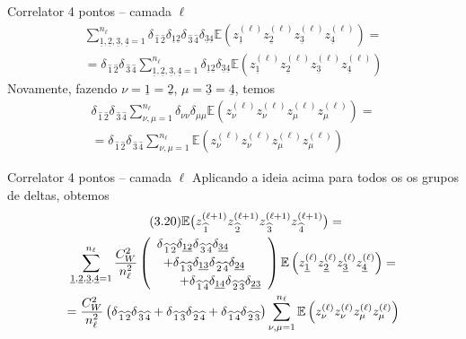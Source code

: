 \documentclass{beamer}
\newcommand{\EE}{\mathbb{E}}
\def\mi#1{{\,\widehat{#1}}}
\def\mj#1{\underline{#1}}
\def\eell{{(\ell)}}
\def\eellum{{(\ell+1)}}
\begin{document}
\begin{frame}{Correlator 4 pontos -- camada $\ell$}
	\begin{multline*}
		\sum_{\mj1,\mj2,\mj3,\mj4=1}^{n_\ell} \delta_{\mi1\mi2}\delta_{\mj1\mj2}\delta_{\mi3\mi4}\delta_{\mj3\mj4} \EE\left( z^\eell_{\mj1}z^\eell_{\mj2}z^\eell_{\mj3}z^\eell_{\mj4}\right) = \\
		= \delta_{\mi1\mi2}\delta_{\mi3\mi4}\sum_{\mj1,\mj2,\mj3,\mj4=1}^{n_\ell} \delta_{\mj1\mj2}\delta_{\mj3\mj4} \EE\left( z^\eell_{\mj1}z^\eell_{\mj2}z^\eell_{\mj3}z^\eell_{\mj4}\right) 
	\end{multline*}
Novamente, fazendo $\nu = \mj1 = \mj2$, $\mu = \mj3 = \mj4$, temos
\begin{multline*}
		\delta_{\mi1\mi2}\delta_{\mi3\mi4}\sum_{\nu,\mu=1}^{n_\ell} \delta_{\nu\nu}\delta_{\mu\mu} \EE\left( z^\eell_{\nu}z^\eell_{\nu}z^\eell_{\mu}z^\eell_{\mu}\right) = \\ 
		=\delta_{\mi1\mi2}\delta_{\mi3\mi4}\sum_{\nu,\mu=1}^{n_\ell} \EE\left( z^\eell_{\nu}z^\eell_{\nu} z^\eell_{\mu}z^\eell_{\mu}\right)
\end{multline*}
\end{frame}

\begin{frame}{Correlator 4 pontos -- camada $\ell$}
	Aplicando a ideia acima para todos os os grupos de deltas, obtemos
	\begin{multline*}\tag{3.20}
		\EE\big(z^\eellum_{\mi1} z^\eellum_{\mi2} z^\eellum_{\mi3} z^\eellum_{\mi4}\big) = \\
		\sum_{\mj1,\mj2,\mj3,\mj4=1}^{n_\ell}\frac{C_W^2}{n_\ell^2}\left(\begin{array}{r}
			\delta_{\mi1\mi2}\delta_{\mj1\mj2}\delta_{\mi3\mi4}\delta_{\mj3\mj4} \hspace{6ex} \\[1mm] 
			+\delta_{\mi1\mi3}\delta_{\mj1\mj3} \delta_{\mi2\mi4}\delta_{\mj2\mj4} \hspace{3ex} \\[1mm]
			+  \delta_{\mi1\mi4}\delta_{\mj1\mj4} \delta_{\mi2\mi3}\delta_{\mj2\mj3}
		\end{array}\right)\EE\left( z^\eell_{\mj1}z^\eell_{\mj2}z^\eell_{\mj3}z^\eell_{\mj4}\right) = \\
		= \frac{C_W^2}{n_\ell^2}\left(\delta_{\mi1\mi2}\delta_{\mi3\mi4}+\delta_{\mi1\mi3}\delta_{\mi2\mi4}+ \delta_{\mi1\mi4}\delta_{\mi2\mi3}\right)\sum_{\nu,\mu=1}^{n_\ell} \EE\left( z^\eell_{\nu}z^\eell_{\nu} z^\eell_{\mu}z^\eell_{\mu}\right)
	\end{multline*}
\end{frame}
\end{document}
